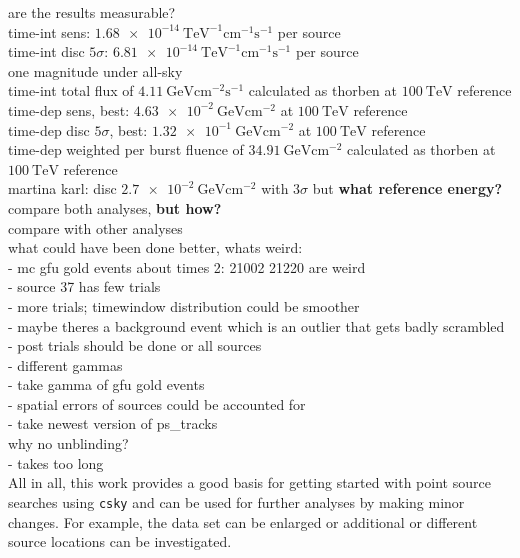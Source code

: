 are the results measurable?\\
time-int sens: $\SI{1.68e-14}{\tera\electronvolt\tothe{-1}\centi\meter\tothe{-1}\second\tothe{-1}}$ per source\\
time-int disc $\num{5}\sigma$: $\SI{6.81e-14}{\tera\electronvolt\tothe{-1}\centi\meter\tothe{-1}\second\tothe{-1}}$ per source\\
one magnitude under all-sky\\
time-int total flux of $\SI{4.11}{\giga\electronvolt\centi\meter\tothe{-2}\second\tothe{-1}}$ calculated as thorben at $\SI{100}{\tera\electronvolt}$ reference\\
time-dep sens, best: $\SI{4.63e-2}{\giga\electronvolt\centi\meter\tothe{-2}}$ at $\SI{100}{\tera\electronvolt}$ reference\\
time-dep disc $\num{5}\sigma$, best: $\SI{1.32e-1}{\giga\electronvolt\centi\meter\tothe{-2}}$ at $\SI{100}{\tera\electronvolt}$ reference\\
time-dep weighted per burst fluence of $\SI{34.91}{\giga\electronvolt\centi\meter\tothe{-2}}$ calculated as thorben at $\SI{100}{\tera\electronvolt}$ reference\\
martina karl: disc $\SI{2.7e-2}{\giga\electronvolt\centi\meter\tothe{-2}}$ with $\num{3}\sigma$ but \textbf{what reference energy?}\\
compare both analyses, \textbf{but how?}\\
compare with other analyses\\

what could have been done better, whats weird:\\
- mc gfu gold events about times 2: 21002 21220 are weird\\
- source 37 has few trials\\
- more trials; timewindow distribution could be smoother\\
- maybe theres a background event which is an outlier that gets badly scrambled\\
- post trials should be done or all sources\\
- different gammas\\
- take gamma of gfu gold events\\
- spatial errors of sources could be accounted for\\
- take newest version of ps\_tracks\\
why no unblinding?\\
- takes too long\\

All in all, this work provides a good basis for getting started with point source searches using \texttt{csky} and can be used for further analyses by making minor changes.
For example, the data set can be enlarged or additional or different source locations can be investigated.
